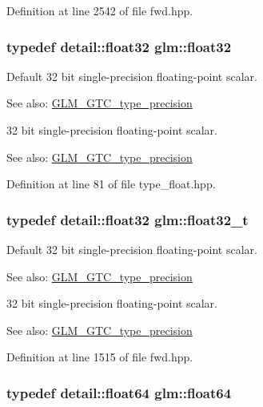 Definition at line 2542 of file fwd.hpp.\hypertarget{group__gtc__type__precision_g814f2f65354b6588b067cc5c67a6b340}{
\subsubsection[float32]{\setlength{\rightskip}{0pt plus 5cm}typedef detail::float32 {\bf glm::float32}}}
\label{group__gtc__type__precision_g814f2f65354b6588b067cc5c67a6b340}


Default 32 bit single-precision floating-point scalar. \begin{Desc}
\item[See also:]\hyperlink{group__gtc__type__precision}{GLM\_\-GTC\_\-type\_\-precision}\end{Desc}
32 bit single-precision floating-point scalar. \begin{Desc}
\item[See also:]\hyperlink{group__gtc__type__precision}{GLM\_\-GTC\_\-type\_\-precision} \end{Desc}


Definition at line 81 of file type\_\-float.hpp.\hypertarget{group__gtc__type__precision_g642737ae3e7c434b366f2191e6944bf2}{
\subsubsection[float32\_\-t]{\setlength{\rightskip}{0pt plus 5cm}typedef detail::float32 {\bf glm::float32\_\-t}}}
\label{group__gtc__type__precision_g642737ae3e7c434b366f2191e6944bf2}


Default 32 bit single-precision floating-point scalar. \begin{Desc}
\item[See also:]\hyperlink{group__gtc__type__precision}{GLM\_\-GTC\_\-type\_\-precision}\end{Desc}
32 bit single-precision floating-point scalar. \begin{Desc}
\item[See also:]\hyperlink{group__gtc__type__precision}{GLM\_\-GTC\_\-type\_\-precision} \end{Desc}


Definition at line 1515 of file fwd.hpp.\hypertarget{group__gtc__type__precision_gb721f828b41f46b20cf4883b50733d3b}{
\subsubsection[float64]{\setlength{\rightskip}{0pt plus 5cm}typedef detail::float64 {\bf glm::float64}}}
\label{group__gtc__type__precision_gb721f828b41f46b20cf4883b50733d3b}


